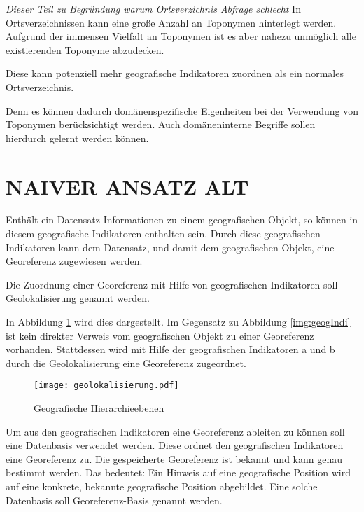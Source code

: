 \textit{Dieser Teil zu Begründung warum Ortsverzichnis Abfrage schlecht} 
			In Ortsverzeichnissen kann eine große Anzahl an Toponymen hinterlegt werden.
			Aufgrund der immensen Vielfalt an Toponymen ist es aber nahezu unmöglich alle existierenden Toponyme abzudecken. 


		Diese kann potenziell mehr geografische Indikatoren zuordnen als ein normales Ortsverzeichnis.

			Denn es können dadurch domänenspezifische Eigenheiten bei der Verwendung von Toponymen berücksichtigt werden. 
			Auch domäneninterne Begriffe sollen hierdurch gelernt werden können.


		\section{NAIVER ANSATZ ALT} \label{sec:ueberblick} 


		Enthält ein Datensatz Informationen zu einem geografischen Objekt, so können in diesem geografische Indikatoren enthalten sein.
		Durch diese geografischen Indikatoren kann dem Datensatz, und damit dem geografischen Objekt, eine Georeferenz zugewiesen werden. 

		Die Zuordnung einer Georeferenz mit Hilfe von geografischen Indikatoren soll Geolokalisierung genannt werden.  

		In Abbildung \ref{img:geolokalisierung} wird dies dargestellt.
		Im Gegensatz zu Abbildung \ref{img:geogIndi} ist kein direkter Verweis vom geografischen Objekt zu einer Georeferenz vorhanden. 
		Stattdessen wird mit Hilfe der geografischen Indikatoren a und b durch die Geolokalisierung eine Georeferenz zugeordnet.

		\begin{figure}[!ht]
		\begin{center}
		\texttt{[image: geolokalisierung.pdf]}
		\caption{Geografische Hierarchieebenen}
		\label{img:geolokalisierung}
		\end{center}
		\end{figure}	

		Um aus den geografischen Indikatoren eine Georeferenz ableiten zu können soll eine Datenbasis verwendet werden.
		Diese ordnet den geografischen Indikatoren eine Georeferenz zu.
		Die gespeicherte Georeferenz ist bekannt und kann genau bestimmt werden. 
		Das bedeutet: Ein Hinweis auf eine geografische Position wird auf eine konkrete, bekannte geografische Position abgebildet.
		Eine solche Datenbasis soll Georeferenz-Basis genannt werden.  

